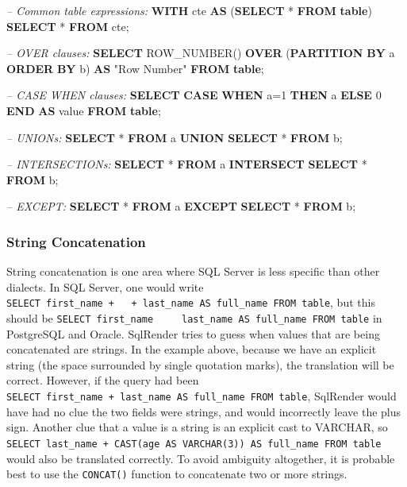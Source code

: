 \documentclass[11pt]{book}
\newenvironment{Shaded}{\begin{snugshade}}{\end{snugshade}}
\newcommand{\KeywordTok}[1]{\textcolor[rgb]{0.13,0.29,0.53}{\textbf{#1}}}
\newcommand{\DecValTok}[1]{\textcolor[rgb]{0.00,0.00,0.81}{#1}}
\newcommand{\CommentTok}[1]{\textcolor[rgb]{0.56,0.35,0.01}{\textit{#1}}}
\newcommand{\OtherTok}[1]{\textcolor[rgb]{0.56,0.35,0.01}{#1}}
\newcommand{\FunctionTok}[1]{\textcolor[rgb]{0.00,0.00,0.00}{#1}}
\newcommand{\NormalTok}[1]{#1}
\theoremstyle{definition}
\theoremstyle{definition}
\theoremstyle{definition}
\theoremstyle{remark}
\begin{document}
\begin{Shaded}
\begin{Highlighting}[]
\CommentTok{-- Common table expressions:}
\KeywordTok{WITH}\NormalTok{ cte }\KeywordTok{AS}\NormalTok{ (}\KeywordTok{SELECT}\NormalTok{ * }\KeywordTok{FROM} \KeywordTok{table}\NormalTok{) }\KeywordTok{SELECT}\NormalTok{ * }\KeywordTok{FROM}\NormalTok{ cte;}

\CommentTok{-- OVER clauses:}
\KeywordTok{SELECT} \FunctionTok{ROW_NUMBER}\NormalTok{() }\KeywordTok{OVER}\NormalTok{ (}\KeywordTok{PARTITION} \KeywordTok{BY}\NormalTok{ a }\KeywordTok{ORDER} \KeywordTok{BY}\NormalTok{ b)}
  \KeywordTok{AS} \OtherTok{"Row Number"} \KeywordTok{FROM} \KeywordTok{table}\NormalTok{;}
  
\CommentTok{-- CASE WHEN clauses:}
\KeywordTok{SELECT} \KeywordTok{CASE} \KeywordTok{WHEN}\NormalTok{ a=}\DecValTok{1} \KeywordTok{THEN}\NormalTok{ a }\KeywordTok{ELSE} \DecValTok{0} \KeywordTok{END} \KeywordTok{AS} \FunctionTok{value} \KeywordTok{FROM} \KeywordTok{table}\NormalTok{;}

\CommentTok{-- UNIONs:}
\KeywordTok{SELECT}\NormalTok{ * }\KeywordTok{FROM}\NormalTok{ a }\KeywordTok{UNION} \KeywordTok{SELECT}\NormalTok{ * }\KeywordTok{FROM}\NormalTok{ b;}

\CommentTok{-- INTERSECTIONs:}
\KeywordTok{SELECT}\NormalTok{ * }\KeywordTok{FROM}\NormalTok{ a }\KeywordTok{INTERSECT} \KeywordTok{SELECT}\NormalTok{ * }\KeywordTok{FROM}\NormalTok{ b;}

\CommentTok{-- EXCEPT:}
\KeywordTok{SELECT}\NormalTok{ * }\KeywordTok{FROM}\NormalTok{ a }\KeywordTok{EXCEPT} \KeywordTok{SELECT}\NormalTok{ * }\KeywordTok{FROM}\NormalTok{ b;}
\end{Highlighting}
\end{Shaded}

\subsubsection*{String Concatenation}\label{string-concatenation}

String concatenation is one area where SQL Server is less specific than
other dialects. In SQL Server, one would write
\texttt{SELECT\ first\_name\ +\ \textquotesingle{}\ \textquotesingle{}\ +\ last\_name\ AS\ full\_name\ FROM\ table},
but this should be
\texttt{SELECT\ first\_name\ \textbar{}\textbar{}\ \textquotesingle{}\ \textquotesingle{}\ \textbar{}\textbar{}\ last\_name\ AS\ full\_name\ FROM\ table}
in PostgreSQL and Oracle. SqlRender tries to guess when values that are
being concatenated are strings. In the example above, because we have an
explicit string (the space surrounded by single quotation marks), the
translation will be correct. However, if the query had been
\texttt{SELECT\ first\_name\ +\ last\_name\ AS\ full\_name\ FROM\ table},
SqlRender would have had no clue the two fields were strings, and would
incorrectly leave the plus sign. Another clue that a value is a string
is an explicit cast to VARCHAR, so
\texttt{SELECT\ last\_name\ +\ CAST(age\ AS\ VARCHAR(3))\ AS\ full\_name\ FROM\ table}
would also be translated correctly. To avoid ambiguity altogether, it is
probable best to use the \texttt{CONCAT()} function to concatenate two
or more strings.
\end{document}
